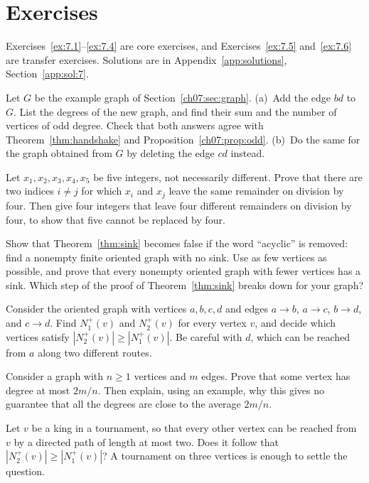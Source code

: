 \section*{Exercises}
Exercises~\ref{ex:7.1}--\ref{ex:7.4} are core exercises, and Exercises~\ref{ex:7.5} and~\ref{ex:7.6} are transfer exercises. Solutions are in Appendix~\ref{app:solutions}, Section~\ref{app:sol:7}.
\begin{exercise}\label{ex:7.1}Let $G$ be the example graph of Section~\ref{ch07:sec:graph}. (a)~Add the edge $bd$ to $G$. List the degrees of the new graph, and find their sum and the number of vertices of odd degree. Check that both answers agree with Theorem~\ref{thm:handshake} and Proposition~\ref{ch07:prop:odd}. (b)~Do the same for the graph obtained from $G$ by deleting the edge $cd$ instead.\end{exercise}
\begin{exercise}\label{ex:7.2}Let $x_1,x_2,x_3,x_4,x_5$ be five integers, not necessarily different. Prove that there are two indices $i\ne j$ for which $x_i$ and $x_j$ leave the same remainder on division by four. Then give four integers that leave four different remainders on division by four, to show that five cannot be replaced by four.\end{exercise}
\begin{exercise}\label{ex:7.3}Show that Theorem~\ref{thm:sink} becomes false if the word ``acyclic'' is removed: find a nonempty finite oriented graph with no sink. Use as few vertices as possible, and prove that every nonempty oriented graph with fewer vertices has a sink. Which step of the proof of Theorem~\ref{thm:sink} breaks down for your graph?\end{exercise}
\begin{exercise}\label{ex:7.4}Consider the oriented graph with vertices $a,b,c,d$ and edges $a\to b$, $a\to c$, $b\to d$, and $c\to d$. Find $N_1^+(v)$ and $N_2^+(v)$ for every vertex $v$, and decide which vertices satisfy $|N_2^+(v)|\ge|N_1^+(v)|$. Be careful with $d$, which can be reached from $a$ along two different routes.\end{exercise}
\begin{exercise}\label{ex:7.5}Consider a graph with $n\ge1$ vertices and $m$ edges. Prove that some vertex has degree at most $2m/n$. Then explain, using an example, why this gives no guarantee that all the degrees are close to the average $2m/n$.\end{exercise}
\begin{exercise}\label{ex:7.6}Let $v$ be a king in a tournament, so that every other vertex can be reached from $v$ by a directed path of length at most two. Does it follow that $|N_2^+(v)|\ge|N_1^+(v)|$? A tournament on three vertices is enough to settle the question.\end{exercise}
